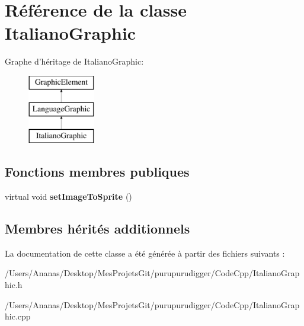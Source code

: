 \hypertarget{class_italiano_graphic}{\section{Référence de la classe Italiano\-Graphic}
\label{class_italiano_graphic}
}
Graphe d'héritage de Italiano\-Graphic\-:\begin{figure}[H]
\begin{center}
\leavevmode
\includegraphics[height=3.000000cm]{class_italiano_graphic}
\end{center}
\end{figure}
\subsection*{Fonctions membres publiques}
\begin{DoxyCompactItemize}
\item 
\hypertarget{class_italiano_graphic_a04c213fd2d6388ec911aa0577f5d6846}{virtual void {\bfseries set\-Image\-To\-Sprite} ()}\label{class_italiano_graphic_a04c213fd2d6388ec911aa0577f5d6846}

\end{DoxyCompactItemize}
\subsection*{Membres hérités additionnels}


La documentation de cette classe a été générée à partir des fichiers suivants \-:\begin{DoxyCompactItemize}
\item 
/\-Users/\-Ananas/\-Desktop/\-Mes\-Projets\-Git/purupurudigger/\-Code\-Cpp/Italiano\-Graphic.\-h\item 
/\-Users/\-Ananas/\-Desktop/\-Mes\-Projets\-Git/purupurudigger/\-Code\-Cpp/Italiano\-Graphic.\-cpp\end{DoxyCompactItemize}
